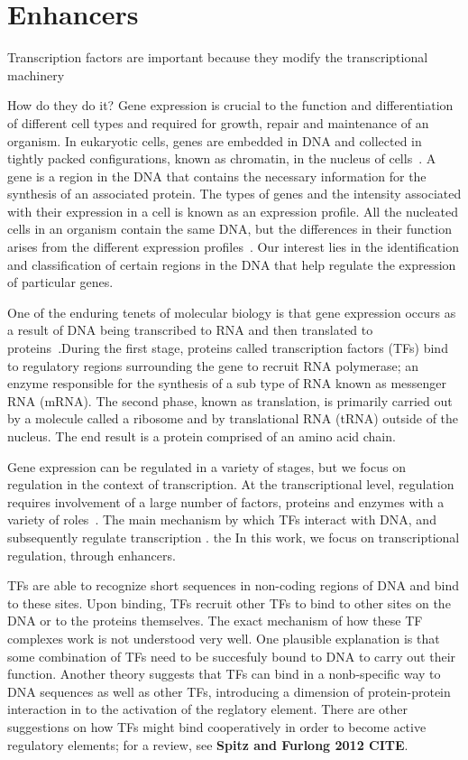 \section{Enhancers}
    Transcription factors are important because they modify the transcriptional machinery
    
    How do they do it?
        Gene expression is crucial to the function and differentiation of different cell types and required for growth, repair and maintenance of an organism.  In eukaryotic cells, genes are embedded in DNA and collected in tightly packed configurations, known as chromatin, in the nucleus of cells~\cite{alberts2002chromosomal}.  A gene is a region in the DNA that contains the necessary information for the synthesis of an associated protein.
        The types of genes and the intensity associated with their expression in a cell is known as an expression profile. All the nucleated cells in an organism contain the same DNA, but the differences in their function arises from the different expression profiles~\cite{lockhart2000genomics}. Our interest lies in the identification and classification of certain regions in the DNA that help regulate the expression of particular genes. 
       

        One of the enduring tenets of molecular biology is that gene expression occurs as a result of DNA being transcribed to RNA and then translated to proteins~\cite{crick1958protein}.During the first stage, proteins called transcription factors (TFs) bind to regulatory regions surrounding the gene to recruit RNA polymerase; an enzyme responsible for the synthesis of a sub type of RNA known as messenger RNA (mRNA). 
        The second phase, known as translation, is primarily carried out by a molecule called a ribosome and by translational RNA (tRNA) outside of the nucleus. The end result is a protein comprised of an amino acid chain.
        
        Gene expression can be regulated in a variety of stages, but we focus on regulation in the context of transcription. 
At the transcriptional level, regulation requires involvement of a large number of factors, proteins and enzymes with a variety
 of roles~\cite{lemon2000orchestrated}. 
The main mechanism by which TFs interact with DNA, and subsequently regulate transcription
. the In this work, we focus on transcriptional regulation, through enhancers.

TFs are able to recognize short sequences in non-coding regions of DNA and bind to these sites. 
Upon binding, TFs recruit other TFs to bind to other sites on the DNA or to the proteins themselves.
The exact mechanism of how these TF complexes work is not understood very well. 
One plausible explanation is that some combination of TFs need to be succesfuly bound to DNA to carry out their function.
Another theory suggests that TFs can bind in a nonb-specific way to DNA sequences as well as other TFs, introducing 
a dimension of protein-protein interaction in to the activation of the reglatory element. 
There are other suggestions on how TFs might bind cooperatively in order to become active regulatory elements; for a review, 
see \textbf{Spitz and Furlong 2012 CITE}. 


